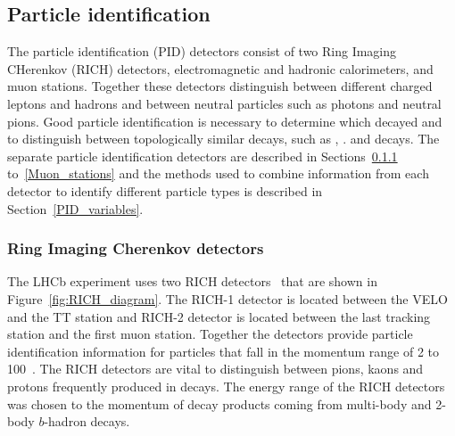 \subsection{Particle identification}
\label{PID}
The particle identification (PID) detectors consist of two Ring Imaging CHerenkov (RICH) detectors, electromagnetic and hadronic calorimeters, and muon stations. Together these detectors distinguish between different charged leptons and hadrons and between neutral particles such as photons and neutral pions. Good particle identification is necessary to determine which \bhadron decayed and to distinguish between topologically similar decays, such as \bdkpi, \bskk. \bdmumu and \bsmumu decays. %
The separate particle identification detectors are described in Sections~\ref{RICH} to~\ref{Muon_stations} and the methods used to combine information from each detector to identify different particle types is described in Section~\ref{PID_variables}. 


\subsubsection{Ring Imaging Cherenkov detectors}
\label{RICH}

The LHCb experiment uses two RICH detectors~\cite{Amato:494263,Adinolfi:2012qfa} that are shown in Figure~\ref{fig:RICH_diagram}.
The RICH-1 detector is located between the VELO and the TT station and RICH-2 detector is located between the last tracking station and the first muon station.
 Together the detectors provide particle identification information for particles that fall in the momentum range of 2 to 100~\gevc.
The RICH detectors are vital to distinguish between pions, kaons and protons frequently produced in \bhadron decays. %
The energy range of the RICH detectors was chosen to the momentum of decay products coming from multi-body and 2-body $b$-hadron decays. %



